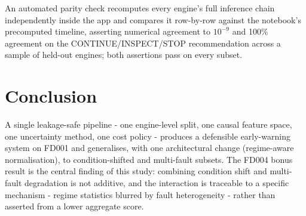 \documentclass[9pt,a4paper,twocolumn,twoside]{rho-class/rho}
\begin{document}
    An automated parity check recomputes every engine's full inference chain independently inside the app and compares it row-by-row against the notebook's precomputed timeline, asserting numerical agreement to $10^{-9}$ and 100\% agreement on the CONTINUE/INSPECT/STOP recommendation across a sample of held-out engines; both assertions pass on every subset.

\section{Conclusion}

    A single leakage-safe pipeline - one engine-level split, one causal feature space, one uncertainty method, one cost policy - produces a defensible early-warning system on FD001 and generalises, with one architectural change (regime-aware normalisation), to condition-shifted and multi-fault subsets. The FD004 bonus result is the central finding of this study: combining condition shift and multi-fault degradation is not additive, and the interaction is traceable to a specific mechanism - regime statistics blurred by fault heterogeneity - rather than asserted from a lower aggregate score.


\printbibliography

\end{document}
